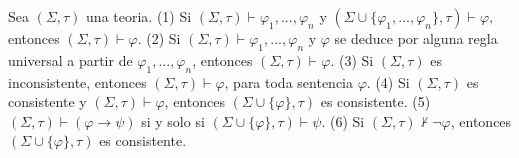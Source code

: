   \begin{lemma}
    Sea \((\Sigma ,\tau )\) una teoria.
    (1) Si \((\Sigma ,\tau )\vdash \varphi _{1},...,\varphi _{n}\) y \( (\Sigma \cup \{\varphi _{1},...,\varphi _{n}\},\tau )\vdash \varphi ,\) entonces \((\Sigma ,\tau )\vdash \varphi .\)
    (2) Si \((\Sigma ,\tau )\vdash \varphi _{1},...,\varphi _{n}\) y \( \varphi \) se deduce por alguna regla universal a partir de \(\varphi _{1},...,\varphi _{n}\), entonces \((\Sigma ,\tau )\vdash \varphi \).
    (3) Si \((\Sigma ,\tau )\) es inconsistente, entonces \((\Sigma ,\tau )\vdash \varphi \), para toda sentencia \(\varphi .\)
    (4) Si \((\Sigma ,\tau )\) es consistente y \((\Sigma ,\tau )\vdash \varphi \), entonces \((\Sigma \cup \{\varphi \},\tau )\) es consistente.
    (5) \((\Sigma ,\tau )\vdash (\varphi \rightarrow \psi )\) si y solo si \( (\Sigma \cup \{\varphi \},\tau )\vdash \psi \).
    (6) Si \((\Sigma ,\tau )\not\vdash \lnot \varphi \), entonces \((\Sigma \cup \{\varphi \},\tau )\) es consistente.
  \end{lemma}
